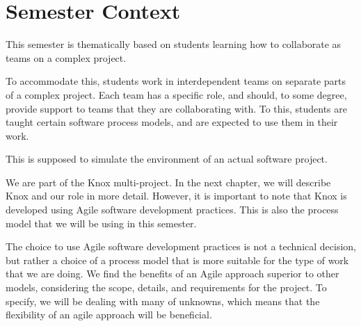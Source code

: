 \section{Semester Context}
This semester is thematically based on students learning how to collaborate as teams on a complex project.

To accommodate this, students work in interdependent teams on separate parts of a complex project. 
Each team has a specific role, and should, to some degree, provide support to teams that they are collaborating with.
To this, students are taught certain software process models, and are expected to use them in their work.

This is supposed to simulate the environment of an actual software project.

We are part of the Knox multi-project. In the next chapter, we will describe Knox and our role in more detail.
However, it is important to note that Knox is developed using Agile software development practices.
This is also the process model that we will be using in this semester.

The choice to use Agile software development practices is not a technical decision, but rather a choice of a process model that is more suitable for the type of work that we are doing.
We find the benefits of an Agile approach superior to other models, considering the scope, details, and requirements for the project.
To specify, we will be dealing with many of unknowns, which means that the flexibility of an agile approach will be beneficial.

% 
